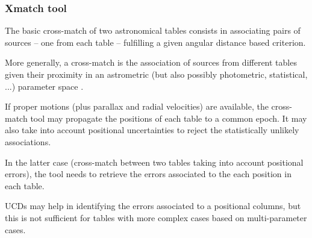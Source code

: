 \subsubsection{Xmatch tool }
The basic cross-match of two astronomical tables consists in associating pairs of sources -- one 
from each table -- fulfilling a given angular distance based criterion.

More generally, a cross-match is the association of sources from different tables given their 
proximity in an astrometric (but also possibly photometric, statistical, ...) parameter
space \citep{2017A&A...597A..89P} .

If proper motions (plus parallax and radial velocities) are available, the cross-match tool 
may propagate the positions of each table to a common epoch.
It may also take into account positional uncertainties to reject the statistically unlikely associations.

In the latter case (cross-match between two tables taking into account positional errors),
the tool needs to retrieve the errors associated to the each position in each table.

UCDs may help in identifying the errors associated to a positional columns, 
but this is not sufficient for tables with more complex cases based on multi-parameter cases.
